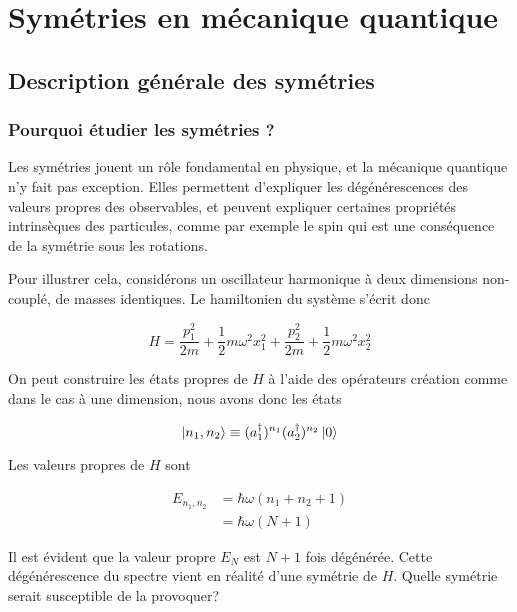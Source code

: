 \documentclass[../notesdecours.tex]{subfiles}
\begin{document}
    \part{Symétries en mécanique quantique}

    \chapter{Description générale des symétries}

    \section{Pourquoi étudier les symétries ?}

    Les symétries jouent un rôle fondamental en physique, et la mécanique quantique n'y fait pas exception. Elles permettent d'expliquer les dégénérescences des valeurs propres des observables, et peuvent expliquer certaines propriétés intrinsèques des particules, comme par exemple le spin qui est une conséquence de la symétrie sous les rotations.

    Pour illustrer cela, considérons un oscillateur harmonique à deux dimensions non-couplé, de masses identiques. Le hamiltonien du système s'écrit donc

    \begin{equation}
    H = \frac{p_1^2}{2m} + \frac{1}{2}m\omega^2x_1^2 + \frac{p_2^2}{2m} + \frac{1}{2}m\omega^2x_2^2
    \end{equation}

    On peut construire les états propres de $H$ à l'aide des opérateurs création comme dans le cas à une dimension, nous avons donc les états 

    \begin{equation}
    \ket{n_1, n_2} \equiv (a_1^\dagger)^{n_1} (a_2^\dagger)^{n_2} \ket{0}
    \end{equation}

    Les valeurs propres de $H$ sont

    \begin{align}
    E_{n_1, n_2} &= \hbar\omega(n_1 + n_2 + 1) \\
    &= \hbar\omega (N+1)
    \end{align}

    Il est évident que la valeur propre $E_N$ est $N+1$ fois dégénérée. Cette dégénérescence du spectre vient en réalité d'une symétrie de $H$. Quelle symétrie serait susceptible de la provoquer?
\end{document}

